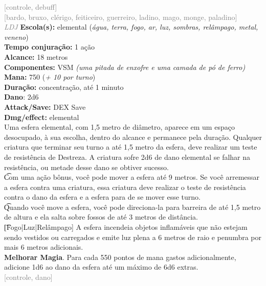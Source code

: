 \documentclass{RPG_Adventure}[2021/10/20]
\begin{document}
{\scriptsize \textcolor{gray}{[controle, debuff]\\}}
{\scriptsize \textcolor{gray}{[bardo, bruxo, clérigo, feiticeiro, guerreiro, ladino, mago, monge, paladino]\\}}
{\tiny \textcolor{gray}{\textit{LDJ}}}
{\small \t \textbf{Escola(s):} elemental (\textit{água, terra, fogo, ar, luz, sombras, relâmpago, metal, veneno})\\\t \textbf{Tempo conjuração:} 1 ação\\\t \textbf{Alcance:} 18 metros\\\t \textbf{Componentes:} VSM \textit{(uma pitada de enxofre e uma camada de pó de ferro)}\\\t \textbf{Mana:} 750 (\textit{+ 10 por turno})\\\t \textbf{Duração:} concentração, até 1 minuto\\\t \textbf{Dano}: 2d6\\\t \textbf{Attack/Save:} DEX Save\\\t \textbf{Dmg/effect:} elemental\\}
{\normalsize Uma esfera elemental, com 1,5 metro de diâmetro, aparece em um espaço desocupado, à sua escolha, dentro do alcance e permanece pela duração. Qualquer criatura que terminar seu turno a até 1,5 metro da esfera, deve realizar um teste de resistência de Destreza. A criatura sofre 2d6 de dano elemental se falhar na resistência, ou metade desse dano se obtiver sucesso.\\\t Com uma ação bônus, você pode mover a esfera até 9 metros. Se você arremessar a esfera contra uma criatura, essa criatura deve realizar o teste de resistência contra o dano da esfera e a esfera para de se mover esse turno.\\\t Quando você move a esfera, você pode direciona-la para barreira de até 1,5 metro de altura e ela salta sobre fossos de até 3 metros de distância.\\\t [Fogo|Luz|Relâmpago] A esfera incendeia objetos inflamáveis que não estejam sendo vestidos ou carregados e emite luz plena a 6 metros de raio e penumbra por mais 6 metros adicionais.\\\t \textbf{Melhorar Magia}. Para cada 550 pontos de mana gastos adicionalmente, adicione 1d6 ao dano da esfera até um máximo de 6d6 extras.\\}
{\scriptsize \textcolor{gray}{[controle, dano]\\}}
\end{document}
